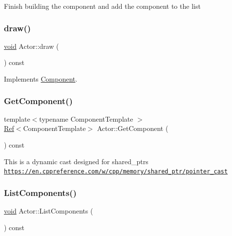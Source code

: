 Finish building the component and add the component to the list \mbox{\label{classActor_adbbdc379c1a471cc9763d871b0790d7e}} 
\subsubsection{\texorpdfstring{draw()}{draw()}}
{\footnotesize\ttfamily \hyperlink{imgui__impl__opengl3__loader_8h_ac668e7cffd9e2e9cfee428b9b2f34fa7}{void} Actor\+::draw (\begin{DoxyParamCaption}{ }\end{DoxyParamCaption}) const\hspace{0.3cm}{\ttfamily [virtual]}}



Implements \hyperlink{classComponent_a8f45309003f02191f2bcc8864e8e9ecf}{Component}.

\mbox{\label{classActor_aea332ed79b7b46b238dd3bb6cdae42df}} 
\subsubsection{\texorpdfstring{Get\+Component()}{GetComponent()}}
{\footnotesize\ttfamily template$<$typename Component\+Template $>$ \\
\hyperlink{BStateMachine_2Component_8h_add5e90b302c31b74a46619f240214bcc}{Ref}$<$Component\+Template$>$ Actor\+::\+Get\+Component (\begin{DoxyParamCaption}{ }\end{DoxyParamCaption}) const\hspace{0.3cm}{\ttfamily [inline]}}

This is a dynamic cast designed for shared\+\_\+ptr\textquotesingle{}s \href{https://en.cppreference.com/w/cpp/memory/shared_ptr/pointer_cast}{\tt https\+://en.\+cppreference.\+com/w/cpp/memory/shared\+\_\+ptr/pointer\+\_\+cast} \mbox{\label{classActor_aa296fdff7201b411576f757da1dc335c}} 
\subsubsection{\texorpdfstring{List\+Components()}{ListComponents()}}
{\footnotesize\ttfamily \hyperlink{imgui__impl__opengl3__loader_8h_ac668e7cffd9e2e9cfee428b9b2f34fa7}{void} Actor\+::\+List\+Components (\begin{DoxyParamCaption}{ }\end{DoxyParamCaption}) const}

